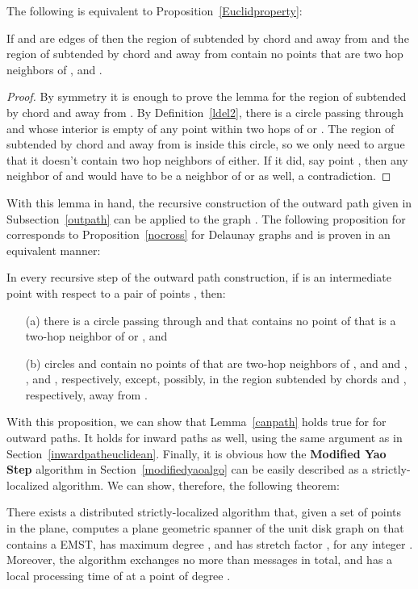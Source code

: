 \documentclass{stacs_proc}
\theoremstyle{plain}\newtheorem{satz}[thm]{Satz}
\begin{document}
The following is equivalent to Proposition~\ref{Euclidproperty}:
\begin{lemma}
\label{UnitDiskproperty} If  and  are edges of  then the region
of  subtended by chord  and away from  and
the region of  subtended by chord  and away from  contain no
points that are two hop neighbors of ,  and .
\begin{proof}
By symmetry it is enough to prove the lemma for  the region of 
subtended by chord  and away from . By Definition~\ref{ldel2},
there is a circle  passing through  and  whose interior
is empty of any point within two hops of  or . The region of 
subtended by chord  and away from  is inside this circle, so we only
need to argue that it doesn't contain two hop neighbors of  either. If it
did, say point , then any neighbor of  and  would have to be a
neighbor of  or  as well, a contradiction.
\end{proof}
\end{lemma}
With this lemma in hand, the recursive construction of the outward path given
in Subsection~\ref{outpath} can be applied to the graph .
The following proposition for  corresponds to
Proposition~\ref{nocross} for Delaunay graphs and is proven in an equivalent
manner:
\begin{proposition}
\label{nocross2} In every recursive step of the outward path
construction, if  is an intermediate point with
respect to a pair of points , then:
\begin{itemize}

\item[(a)] there is a circle passing through  and  that contains
no point of  that is a two-hop neighbor of  or , and

\item[(b)] circles  and  contain no
points of  that are two-hop neighbors of ,  and  and ,
, and , respectively, except, possibly, in the region subtended by
chords  and , respectively, away from .
\end{itemize}
\end{proposition}
With this proposition, we can show that Lemma~\ref{canpath} holds
true for  for outward paths. It holds for inward paths
as well, using the same argument as in Section~\ref{inwardpatheuclidean}.  
Finally, it is obvious how the {\bf Modified Yao Step} algorithm in
Section~\ref{modifiedyaoalgo} can be easily described as a
strictly-localized algorithm. We can show, therefore, the following theorem:
\begin{theorem}
\label{spannerunit} There exists a distributed strictly-localized
algorithm that, given a set  of  points in the plane, computes a plane
geometric spanner of the unit disk graph on  that contains a EMST, has
maximum degree , and has stretch factor
,
for any integer . Moreover, the algorithm exchanges no
more than  messages in total, and has a local processing time
of  at a point of degree .
\end{theorem}
\end{document}
